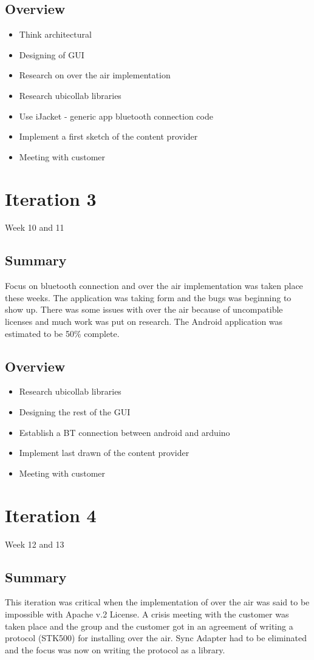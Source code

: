 \subsection{Overview}
\begin{itemize}
	\item{Think architectural}
	\item{Designing of GUI}
	\item{Research on over the air implementation}
	\item{Research ubicollab libraries}
	\item{Use iJacket - generic app bluetooth connection code}
	\item{Implement a first sketch of the content provider}
	\item{Meeting with customer}
\end{itemize}

\section{Iteration 3}
Week 10 and 11
\subsection{Summary}
	Focus on bluetooth connection and over the air implementation was taken place these weeks. The application was taking form
	and the bugs was beginning to show up. There was some issues with over the air because of uncompatible licenses and much work was
	put on research. The Android application was estimated to be 50\% complete.

\subsection{Overview}
\begin{itemize}
	\item{Research ubicollab libraries}
	\item{Designing the rest of the GUI}
	\item{Establish a BT connection between android and arduino}
	\item{Implement last drawn of the content provider}
	\item{Meeting with customer}
\end{itemize}

\section{Iteration 4}
Week 12 and 13
\subsection{Summary}
	This iteration was critical when the implementation of over the air was said to be impossible with Apache v.2 License. 
	A crisis meeting with the customer was taken place and the group and the customer got in an agreement of writing
	a protocol (STK500) for installing over the air. Sync Adapter had to be eliminated and the focus was now on writing the protocol as a library.

